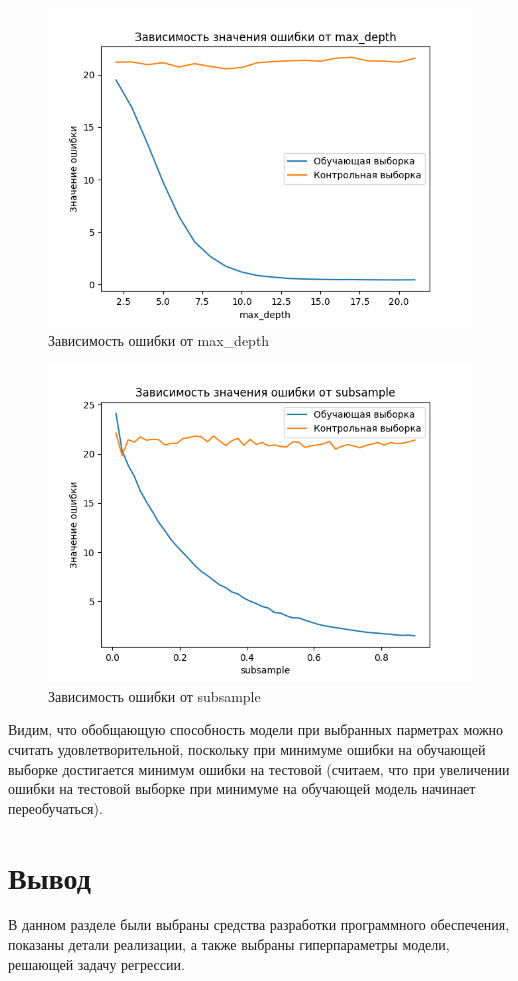 \begin{figure}[h!]
	\centering
	\includegraphics[scale = 0.8]{img/research_max_depth.png}
	\caption{Зависимость ошибки от max\_depth}
	\label{fig:md}
\end{figure}
\newpage
\begin{figure}[h!]
	\centering
	\includegraphics[scale = 0.8]{img/research_subsample.png}
	\caption{Зависимость ошибки от subsample}
	\label{fig:subsample}
\end{figure}

Видим, что обобщающую способность модели при выбранных парметрах можно считать удовлетворительной, поскольку при минимуме ошибки на обучающей выборке достигается минимум ошибки на тестовой (считаем, что при увеличении ошибки на тестовой выборке при минимуме на обучающей модель начинает переобучаться).
\section*{Вывод}

В данном разделе были выбраны средства разработки программного обеспечения, показаны детали реализации, а также выбраны гиперпараметры модели, решающей задачу регрессии.